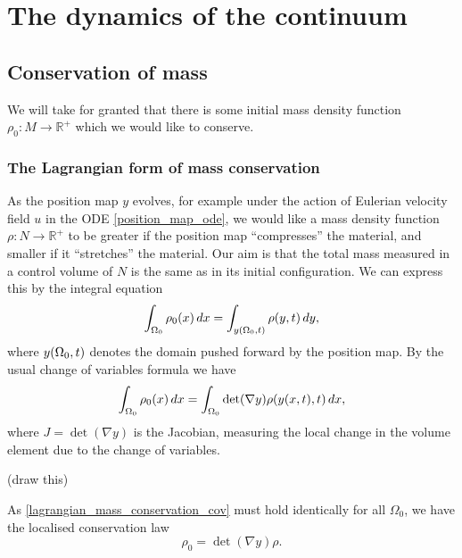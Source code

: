 
\section{The dynamics of the continuum}
\subsection{Conservation of mass}
We will take for granted that there is some initial mass density function $\rho_0:M\rightarrow \mathbb{R}^+$
which we would like to conserve.
\subsubsection{The Lagrangian form of mass conservation}
As the position map $y$ evolves, for example under the action of Eulerian velocity field $u$ in the ODE \eqref{position_map_ode},
we would like a mass density function $\rho : N \rightarrow \mathbb{R}^+$ to be greater if the position map ``compresses'' the material,
and smaller if it ``stretches'' the material. Our aim is that the total mass measured in a control volume of $N$ is the same as in its initial configuration.
We can express this by the integral equation
\begin{equation}\label{lagrangian_mass_conservation}
    \int_{{\Omega_0}} \rho_0(x)\,dx = \int_{y({\Omega_0}, t)} \rho(y, t)\,dy,
\end{equation}
where $y({\Omega_0}, t)$ denotes the domain pushed forward by the position map. By the usual change of variables formula we have
\begin{equation}\label{lagrangian_mass_conservation_cov}
    \int_{{\Omega_0}} \rho_0(x)\,dx = \int_{{\Omega_0}} \det(\nabla y)\rho(y(x,t), t)\,dx,
\end{equation}
where $J = \det(\nabla y)$ is the Jacobian, measuring the local change in the volume element due to the change of variables.

\vskip 0.2in
(draw this)
\vskip 0.2in

As \eqref{lagrangian_mass_conservation_cov} must hold identically for all $\Omega_0$, we have the localised conservation law
\begin{equation}\label{lagrangian_mass_conservation_local}
    \rho_0 = \det(\nabla y)\rho.
\end{equation}


